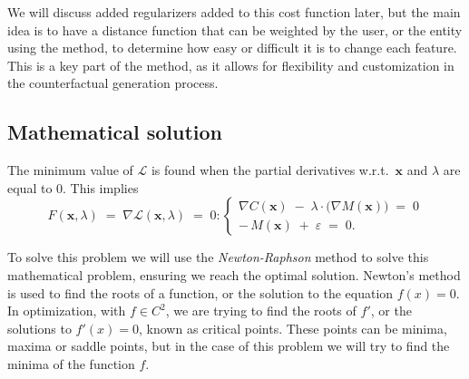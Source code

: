 \documentclass[12pt]{extarticle}
\numberwithin{equation}{section}
\begin{document}
We will discuss added regularizers added to this cost function later, but the main idea is to have a distance function that can be weighted by the user, or the entity using the method, to determine how easy or difficult it is to change each feature. This is a key part of the method, as it allows for flexibility and customization in the counterfactual generation process.

\subsection{Mathematical solution}\label{sec:mathematical}
The minimum value of $\mathcal{L}$ is found when the partial derivatives 
w.r.t.\ $\mathbf{x}$ and $\lambda$ are equal to 0. This implies
\begin{equation}\label{eq:deriv}
F(\mathbf{x}, \lambda) \;=\; \nabla \mathcal{L}(\mathbf{x}, \lambda) \;=\; 0:
\begin{cases}
\nabla C(\mathbf{x}) \;-\;\lambda \cdot \bigl(\nabla M(\mathbf{x})\bigr) \;=\; 0 \\
-\,M(\mathbf{x})\;+\;\varepsilon\;=\;0.
\end{cases}
\end{equation}

To solve this problem we will use the \emph{Newton-Raphson} method to solve this mathematical problem, ensuring we reach the optimal solution. Newton's method is used to find the roots of a function, or the solution to the equation $f(x) = 0$. In optimization, with $f \in C^2$, we are trying to find the roots of $f'$, or the solutions to $f'(x) = 0$, known as critical points. These points can be minima, maxima or saddle points, but in the case of this problem we will try to find the minima of the function $f$.
\end{document}

